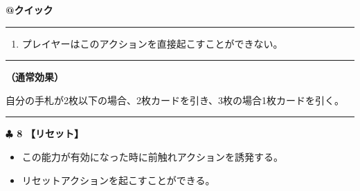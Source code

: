 \documentclass[twocolumn,a5paper,papersize,10pt]{jarticle}
\begin{document}
\begin{tcolorbox}[title={\small\bf【Action】手札補充}{\scriptsize （誘発）}]

{\scriptsize\bf @クイック }

\vspace{1mm} %
\hrule height 0.1mm depth 0mm width 62mm %
\vspace{1mm} %


\vspace{-1zh}%
\begin{enumerate}
\renewcommand{\labelenumi}{※}
\setlength{\leftskip}{-0.3cm}
\setlength{\itemsep}{0pt} %
\setlength{\parskip}{0pt} %

\item プレイヤーはこのアクションを直接起こすことができない。

\vspace{-3mm}%
\end{enumerate}
\vspace{-2mm} %
\vspace{1zh}%
\vspace{1mm} %
\hrule height 0.1mm depth 0mm width 62mm %
\vspace{1mm} %

{\bf（通常効果）}

自分の手札が2枚以下の場合、2枚カードを引き、3枚の場合1枚カードを引く。

\vspace{1mm} %
\end{tcolorbox}

\vspace{-1zh}

 
 
 
 
 

\vspace{3mm} %
\hrule height 0.5mm depth 0mm width 66.5mm %
\vspace{1mm} %
{\Large\bf $\clubsuit$ 8} {\normalsize\bf【リセット】} %
\vspace{1mm} %


\vspace{-1zh}%
\begin{itemize}
\setlength{\leftskip}{-0.3cm}
\setlength{\parskip}{0pt} %

\item この能力が有効になった時に前触れアクションを誘発する。

\item リセットアクションを起こすことができる。
\vspace{-1zh}%
\end{itemize}
\end{document}
